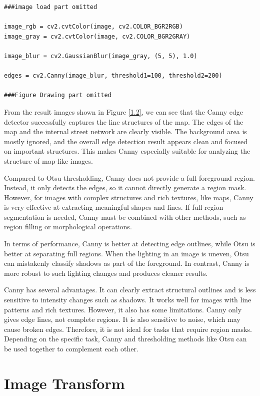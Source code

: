 \documentclass[12pt]{article}
\begin{document}
\begin{lstlisting}
###image load part omitted

image_rgb = cv2.cvtColor(image, cv2.COLOR_BGR2RGB)
image_gray = cv2.cvtColor(image, cv2.COLOR_BGR2GRAY)

image_blur = cv2.GaussianBlur(image_gray, (5, 5), 1.0)

edges = cv2.Canny(image_blur, threshold1=100, threshold2=200)

###Figure Drawing part omitted
\end{lstlisting}
From the result images shown in Figure \ref{1.2}, we can see that the Canny edge detector successfully captures the line structures of the map. The edges of the map and the internal street network are clearly visible. The background area is mostly ignored, and the overall edge detection result appears clean and focused on important structures. This makes Canny especially suitable for analyzing the structure of map-like images.

Compared to Otsu thresholding, Canny does not provide a full foreground region. Instead, it only detects the edges, so it cannot directly generate a region mask. However, for images with complex structures and rich textures, like maps, Canny is very effective at extracting meaningful shapes and lines. If full region segmentation is needed, Canny must be combined with other methods, such as region filling or morphological operations.

In terms of performance, Canny is better at detecting edge outlines, while Otsu is better at separating full regions. When the lighting in an image is uneven, Otsu can mistakenly classify shadows as part of the foreground. In contrast, Canny is more robust to such lighting changes and produces cleaner results.

Canny has several advantages. It can clearly extract structural outlines and is less sensitive to intensity changes such as shadows. It works well for images with line patterns and rich textures. However, it also has some limitations. Canny only gives edge lines, not complete regions. It is also sensitive to noise, which may cause broken edges. Therefore, it is not ideal for tasks that require region masks. Depending on the specific task, Canny and thresholding methods like Otsu can be used together to complement each other.


\section{Image Transform}
\end{document}

